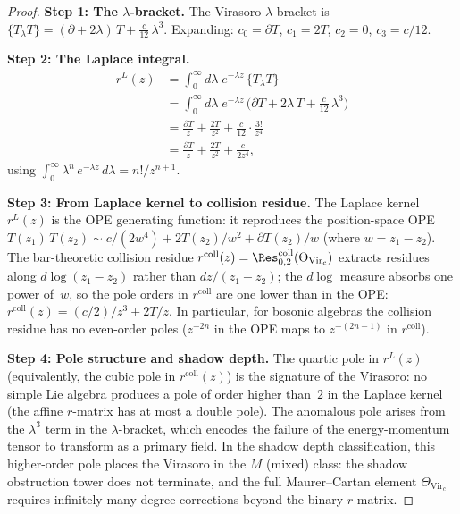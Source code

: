 \begin{proof}
\noindent\textbf{Step 1: The $\lambda$-bracket.}
The Virasoro $\lambda$-bracket is
$\{T {}_\lambda T\} = (\partial + 2\lambda)\, T +
\frac{c}{12}\,\lambda^3$.
Expanding: $c_0 = \partial T$, $c_1 = 2T$, $c_2 = 0$,
$c_3 = c/12$.

\medskip
\noindent\textbf{Step 2: The Laplace integral.}
\begin{align*}
r^L(z) &= \int_0^\infty d\lambda\; e^{-\lambda z}\,
\{T {}_\lambda T\} \\
&= \int_0^\infty d\lambda\; e^{-\lambda z}\,
\bigl(\partial T + 2\lambda\, T + \tfrac{c}{12}\,\lambda^3\bigr) \\
&= \frac{\partial T}{z} + \frac{2T}{z^2}
+ \frac{c}{12} \cdot \frac{3!}{z^4} \\
&= \frac{\partial T}{z} + \frac{2T}{z^2} + \frac{c}{2z^4},
\end{align*}
using $\int_0^\infty \lambda^n\, e^{-\lambda z}\, d\lambda
= n!/z^{n+1}$.

\medskip
\noindent\textbf{Step 3: From Laplace kernel to collision residue.}
The Laplace kernel $r^L(z)$ is the OPE generating function: it
reproduces the position-space OPE
$T(z_1)\, T(z_2) \sim c/(2w^4) + 2T(z_2)/w^2 + \partial T(z_2)/w$
(where $w = z_1 - z_2$).
The bar-theoretic collision residue
$r^{\mathrm{coll}}(z) =
\Res^{\mathrm{coll}}_{0,2}(\Theta_{\mathrm{Vir}_c})$
extracts residues along $d\log(z_1 - z_2)$ rather than
$dz/(z_1 - z_2)$; the $d\log$ measure absorbs one power of~$w$,
so the pole orders in $r^{\mathrm{coll}}$ are one lower than
in the OPE:
$r^{\mathrm{coll}}(z) = (c/2)/z^3 + 2T/z$.
In particular, for bosonic algebras the collision residue has no
even-order poles ($z^{-2n}$ in the OPE maps to $z^{-(2n-1)}$ in
$r^{\mathrm{coll}}$).

\medskip
\noindent\textbf{Step 4: Pole structure and shadow depth.}
The quartic pole in $r^L(z)$ (equivalently, the cubic pole in
$r^{\mathrm{coll}}(z)$) is the signature of the Virasoro: no
simple Lie algebra produces a pole of order higher than~$2$ in the
Laplace kernel (the affine $r$-matrix has at most a double pole).
The anomalous pole arises from the $\lambda^3$ term in the
$\lambda$-bracket, which encodes the failure of the
energy-momentum tensor to transform as a primary field.
In the shadow depth classification, this higher-order pole places
the Virasoro in the $M$ (mixed) class: the shadow obstruction tower does not
terminate, and the full Maurer--Cartan element
$\Theta_{\mathrm{Vir}_c}$ requires infinitely many degree
corrections beyond the binary $r$-matrix.
\end{proof}

